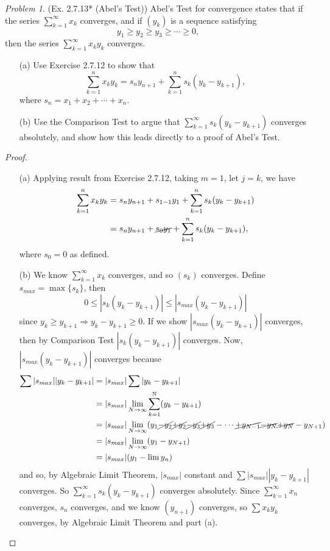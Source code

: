 \documentclass[11pt,twoside, reqno]{amsart}
\theoremstyle{remark}
\newtheorem{Prob}{Problem}
\def\N{\mathbb N}
\renewcommand{\implies}{\Rightarrow}
\begin{document}
\begin{Prob}(Ex. 2.7.13* (Abel's Test)) Abel's Test for convergence states that if the series $\sum^\infty_{k=1}x_k$ converges, and if $(y_k)$ is a sequence satisfying
$$
    y_1 \geq y_2 \geq y_3 \geq \cdots \geq 0,
$$
then the series $\sum^\infty_{k=1}x_ky_k$ converges.
\begin{enumerate}
    \item [(a)] Use Exercise 2.7.12 to show that
    $$
        \sum\limits_{k=1}^n x_ky_k = s_ny_{n+1} + \sum\limits_{k=1}^n s_k(y_k - y_{k+1}),
    $$
    where $s_n = x_1 + x_2 + \cdots + x_n$.
    \item [(b)] Use the Comparison Test to argue that $\sum^\infty_{k=1}s_k(y_k-y_{k+1})$ converges absolutely, and show how this leads directly to a proof of Abel's Test.
\end{enumerate}
\end{Prob}

\begin{proof}
\begin{enumerate}
    \item [(a)] Applying result from Exercise 2.7.12, taking $m = 1$, let $j = k$, we have
    \begin{align*}
        \sum\limits_{k=1}^n x_ky_k &= s_ny_{n+1} + s_{1-1}y_1 + \sum\limits_{k=1}^n s_k(y_k - y_{k+1}) \\
        &= s_ny_{n+1} + \cancel{s_0y_1} + \sum\limits_{k=1}^n s_k(y_k - y_{k+1}),
    \end{align*}
    where $s_0 = 0$ as defined.
    \item [(b)] We know $\sum_{k=1}^\infty x_k$ converges, and so $(s_k)$ converges. Define $s_{max} = \max\{s_k\}$, then
    $$
        0 \leq |s_k(y_k - y_{k+1})| \leq |s_{max}(y_k - y_{k+1})|
    $$
    since $y_k \geq y_{k+1} \implies y_k - y_{k+1} \geq 0$. If we show $|s_{max}(y_k - y_{k+1})|$ converges, then by Comparison Test $|s_k(y_k - y_{k+1})|$ converges. Now, $|s_{max}(y_k - y_{k+1})|$ converges because 
    \begin{align*}
        \sum|s_{max}||y_k - y_{k+1}| &= |s_{max}|\sum|y_k - y_{k+1}| \\
        &= |s_{max}|\lim_{N \to \infty} \sum^\N_{k=1}(y_k - y_{k+1}) \\
        &= |s_{max}|\lim_{N \to \infty} (y_1 \cancel{- y_2} 
        \cancel{+ y_2} \cancel{- y_3} \cancel{+ y_3} - \cdots \cancel{+ y_{N-1}} \cancel{- y_N} \cancel{+ y_N} - y_{N+1}) \\
        &= |s_{max}|\lim_{N \to \infty} (y_1 - y_{N+1}) \\
        &= |s_{max}|(y_1 - \lim y_n)
    \end{align*}
    and so, by Algebraic Limit Theorem, $|s_{max}|$ constant and $\sum|s_{max}||y_k - y_{k+1}|$ converges. So $\sum^\infty_{k=1}s_k(y_k - y_{k+1})$ converges absolutely. Since $\sum_{k=1}^\infty x_n$ converges, $s_n$ converges, and we know $(y_{n+1})$ converges, so $\sum x_ky_k$ converges, by Algebraic Limit Theorem and part (a).
\end{enumerate}

\end{proof}
\end{document}
